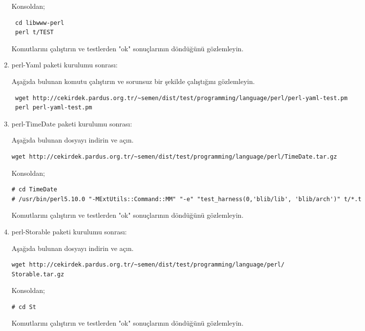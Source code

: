 \documentclass[a4paper,10pt]{article}
\begin{document}
\begin{enumerate}
Konsoldan;
\begin{verbatim}
 cd libwww-perl
 perl t/TEST
\end{verbatim}

Komutlarını çalıştırın ve testlerden "ok" sonuçlarının döndüğünü gözlemleyin.

\item perl-Yaml paketi kurulumu sonrası:

Aşağıda bulunan komutu çalıştırın ve sorunsuz bir şekilde çalıştığını gözlemleyin.
\begin{verbatim}
 wget http://cekirdek.pardus.org.tr/~semen/dist/test/programming/language/perl/perl-yaml-test.pm
 perl perl-yaml-test.pm
\end{verbatim}

\item perl-TimeDate paketi kurulumu sonrası:

Aşağıda bulunan dosyayı indirin ve açın.
\begin{verbatim}
wget http://cekirdek.pardus.org.tr/~semen/dist/test/programming/language/perl/TimeDate.tar.gz
\end{verbatim}

Konsoldan;
\begin{verbatim}
# cd TimeDate
# /usr/bin/perl5.10.0 "-MExtUtils::Command::MM" "-e" "test_harness(0,'blib/lib', 'blib/arch')" t/*.t
\end{verbatim}

Komutlarını çalıştırın ve testlerden "ok" sonuçlarının döndüğünü gözlemleyin.

\item perl-Storable paketi kurulumu sonrası:

Aşağıda bulunan dosyayı indirin ve açın.
\begin{verbatim}
wget http://cekirdek.pardus.org.tr/~semen/dist/test/programming/language/perl/
Storable.tar.gz
\end{verbatim}

Konsoldan;
\begin{verbatim}
# cd St
\end{verbatim}

Komutlarını çalıştırın ve testlerden "ok" sonuçlarının döndüğünü gözlemleyin.

% 
% 
% 


\end{enumerate}
\end{document}
